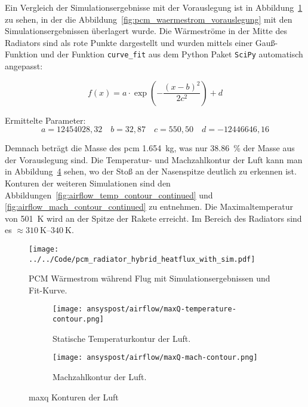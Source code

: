 \begin{minipage}{\textwidth}
  Ein Vergleich der Simulationsergebnisse mit der Vorauslegung ist in Abbildung~\ref{fig:pcm_waermestrom_sim} zu sehen, in der die Abbildung~\ref{fig:pcm_waermestrom_vorauslegung} mit den
  Simulationsergebnissen überlagert wurde. Die Wärmeströme in der Mitte des Radiators sind als rote Punkte dargestellt und wurden mittels einer Gauß-Funktion und der Funktion \texttt{curve\_fit} aus dem
  Python Paket \texttt{SciPy} automatisch angepasst:

  \begin{equation*}
  f(x) = a \cdot \exp\!\left(-\frac{(x-b)^2}{2c^2}\right) + d
  \end{equation*}

  Ermittelte Parameter:
  \begin{equation*}
    a=12454028,32 \quad b=32,87 \quad c=550,50 \quad d=-12446646,16
  \end{equation*}
\end{minipage}

Demnach beträgt die Masse des \ac{pcm} \SI{1,654}{\kilogram}, was nur \SI{38,86}{\percent} der Masse aus der Vorauslegung sind.
Die Temperatur- und Machzahlkontur der Luft kann man in Abbildung~\ref{fig:maxQ_konturen} sehen, wo der Stoß an der Nasenspitze
deutlich zu erkennen ist. Konturen der weiteren Simulationen sind den Abbildungen~\ref{fig:airflow_temp_contour_continued}
und \ref{fig:airflow_mach_contour_continued} zu entnehmen. Die Maximaltemperatur von \SI{501}{\kelvin} wird an der Spitze der Rakete erreicht.
Im Bereich des Radiators sind es $\approx \SIrange{310}{340}{\kelvin}$.

\begin{figure}
  \centering
  \texttt{[image: ../../Code/pcm\_radiator\_hybrid\_heatflux\_with\_sim.pdf]}
  \caption{PCM Wärmestrom während Flug mit Simulationsergebnissen und Fit-Kurve.}\label{fig:pcm_waermestrom_sim}
\end{figure}

\begin{figure}
    \centering

    \begin{subfigure}{\textwidth}
        \centering
        \texttt{[image: ansyspost/airflow/maxQ-temperature-contour.png]}
        \caption{Statische Temperaturkontur der Luft.}
        \label{fig:maxQ_temp_contour}
    \end{subfigure}

    \begin{subfigure}{\textwidth}
        \centering
        \texttt{[image: ansyspost/airflow/maxQ-mach-contour.png]}
        \caption{Machzahlkontur der Luft.}
        \label{fig:maxQ_mach_contour}
    \end{subfigure}

    \caption{\texorpdfstring{\acs{maxq}}{max Q} Konturen der Luft}
    \label{fig:maxQ_konturen}
\end{figure}